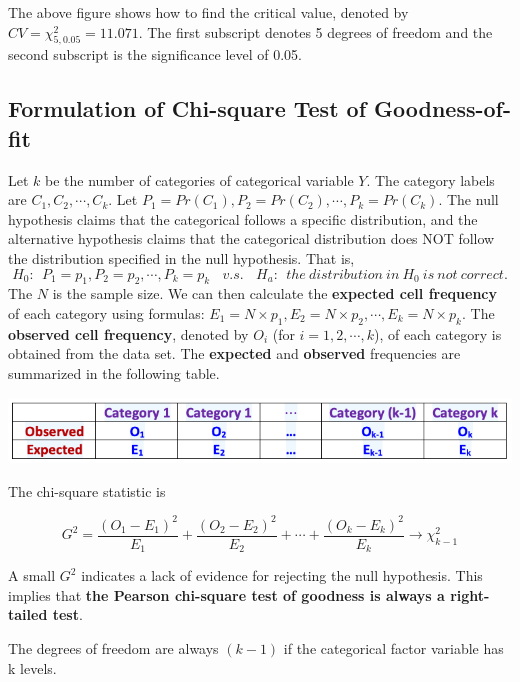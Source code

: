 \documentclass[
]{book}
\begin{document}
The above figure shows how to find the critical value, denoted by \(CV = \chi^2_{5, 0.05} = 11.071\). The first subscript denotes 5 degrees of freedom and the second subscript is the significance level of 0.05.

\hypertarget{formulation-of-chi-square-test-of-goodness-of-fit}{%
\subsection{Formulation of Chi-square Test of Goodness-of-fit}\label{formulation-of-chi-square-test-of-goodness-of-fit}}

Let \(k\) be the number of categories of categorical variable \(Y\). The category labels are \(C_1, C_2, \cdots, C_k\). Let \(P_1 = Pr(C_1), P_2 = Pr(C_2), \cdots, P_k = Pr(C_k)\). The null hypothesis claims that the categorical follows a specific distribution, and the alternative hypothesis claims that the categorical distribution does NOT follow the distribution specified in the null hypothesis. That is,
\[
H_0:\ \ P_1 = p_1, P_2 = p_2, \cdots, P_k = p_k \ \ \ \ v.s. \  \  \  \  H_a: \ \ the \ distribution \ in \ H_0 \ is \ not \ correct.
\]
The \(N\) is the sample size. We can then calculate the \textbf{expected cell frequency} of each category using formulas: \(E_1 = N\times p_1, E_2 = N \times p_2, \cdots, E_k = N \times p_k\). The \textbf{observed cell frequency}, denoted by \(O_i\) (for \(i=1,2, \cdots, k\)), of each category is obtained from the data set. The \textbf{expected} and \textbf{observed} frequencies are summarized in the following table.

\begin{center}\includegraphics[width=0.6\linewidth]{week13/obsExpTable} \end{center}

The chi-square statistic is

\[
G^2 = \frac{(O_1-E_1)^2}{E_1} + \frac{(O_2-E_2)^2}{E_2} + \cdots + \frac{(O_k-E_k)^2}{E_k} \to \chi_{k-1}^2
\]

A small \(G^2\) indicates a lack of evidence for rejecting the null hypothesis. This implies that \textbf{the Pearson chi-square test of goodness is always a right-tailed test}.

The degrees of freedom are always \((k-1)\) if the categorical factor variable has k levels.
\end{document}
